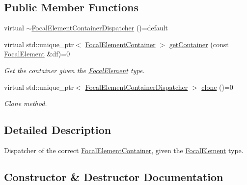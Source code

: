 \subsection*{Public Member Functions}
\begin{DoxyCompactItemize}
\item 
virtual \hyperlink{classFocalElementContainerDispatcher_adc837f38d6ef66d919fc55c9a7933d1b}{$\sim$\+Focal\+Element\+Container\+Dispatcher} ()=default
\item 
virtual std\+::unique\+\_\+ptr$<$ \hyperlink{classFocalElementContainer}{Focal\+Element\+Container} $>$ \hyperlink{classFocalElementContainerDispatcher_a8f48fb2a87d6ceaefbeaf4b754ea7f2e}{get\+Container} (const \hyperlink{classFocalElement}{Focal\+Element} \&df)=0
\begin{DoxyCompactList}\small\item\em Get the container given the \hyperlink{classFocalElement}{Focal\+Element} type. \end{DoxyCompactList}\item 
virtual std\+::unique\+\_\+ptr$<$ \hyperlink{classFocalElementContainerDispatcher}{Focal\+Element\+Container\+Dispatcher} $>$ \hyperlink{classFocalElementContainerDispatcher_a710d8bb32947cde2ad5c5e914f33b767}{clone} ()=0
\begin{DoxyCompactList}\small\item\em Clone method. \end{DoxyCompactList}\end{DoxyCompactItemize}


\subsection{Detailed Description}
Dispatcher of the correct \hyperlink{classFocalElementContainer}{Focal\+Element\+Container}, given the \hyperlink{classFocalElement}{Focal\+Element} type. 

\subsection{Constructor \& Destructor Documentation}
